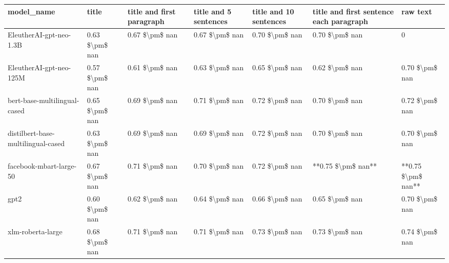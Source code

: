 \begin{tabular}{lllllll}
\toprule
                        model\_name &          title & title and first paragraph & title and 5 sentences & title and 10 sentences & title and first sentence each paragraph &           raw text \\
\midrule
           EleutherAI-gpt-neo-1.3B & 0.63 \$\textbackslash pm\$ nan &            0.67 \$\textbackslash pm\$ nan &        0.67 \$\textbackslash pm\$ nan &         0.70 \$\textbackslash pm\$ nan &                          0.70 \$\textbackslash pm\$ nan &                  0 \\
           EleutherAI-gpt-neo-125M & 0.57 \$\textbackslash pm\$ nan &            0.61 \$\textbackslash pm\$ nan &        0.63 \$\textbackslash pm\$ nan &         0.65 \$\textbackslash pm\$ nan &                          0.62 \$\textbackslash pm\$ nan &     0.70 \$\textbackslash pm\$ nan \\
      bert-base-multilingual-cased & 0.65 \$\textbackslash pm\$ nan &            0.69 \$\textbackslash pm\$ nan &        0.71 \$\textbackslash pm\$ nan &         0.72 \$\textbackslash pm\$ nan &                          0.70 \$\textbackslash pm\$ nan &     0.72 \$\textbackslash pm\$ nan \\
distilbert-base-multilingual-cased & 0.63 \$\textbackslash pm\$ nan &            0.69 \$\textbackslash pm\$ nan &        0.69 \$\textbackslash pm\$ nan &         0.72 \$\textbackslash pm\$ nan &                          0.70 \$\textbackslash pm\$ nan &     0.70 \$\textbackslash pm\$ nan \\
           facebook-mbart-large-50 & 0.67 \$\textbackslash pm\$ nan &            0.71 \$\textbackslash pm\$ nan &        0.70 \$\textbackslash pm\$ nan &         0.72 \$\textbackslash pm\$ nan &                      **0.75 \$\textbackslash pm\$ nan** & **0.75 \$\textbackslash pm\$ nan** \\
                              gpt2 & 0.60 \$\textbackslash pm\$ nan &            0.62 \$\textbackslash pm\$ nan &        0.64 \$\textbackslash pm\$ nan &         0.66 \$\textbackslash pm\$ nan &                          0.65 \$\textbackslash pm\$ nan &     0.70 \$\textbackslash pm\$ nan \\
                 xlm-roberta-large & 0.68 \$\textbackslash pm\$ nan &            0.71 \$\textbackslash pm\$ nan &        0.71 \$\textbackslash pm\$ nan &         0.73 \$\textbackslash pm\$ nan &                          0.73 \$\textbackslash pm\$ nan &     0.74 \$\textbackslash pm\$ nan \\
\bottomrule
\end{tabular}
